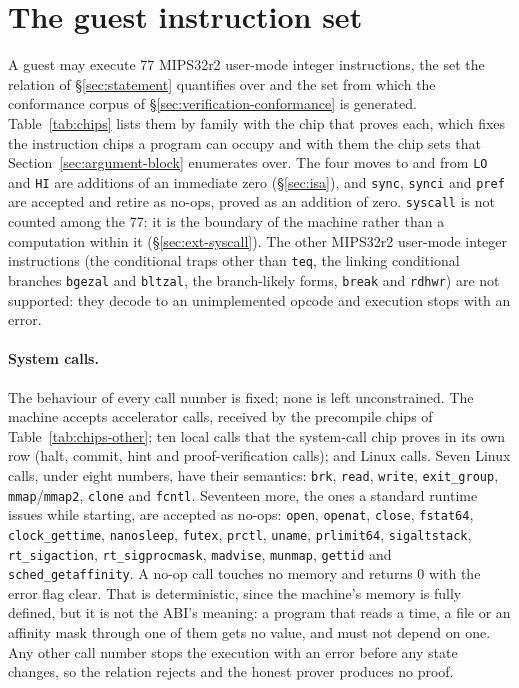 \section{The guest instruction set}
\label{sec:app-isa}

A guest may execute 77 MIPS32r2 user-mode integer instructions, the set the relation of \S\ref{sec:statement} quantifies over and the set from which the conformance corpus of \S\ref{sec:verification-conformance} is generated. Table~\ref{tab:chips} lists them by family with the chip that proves each, which fixes the instruction chips a program can occupy and with them the chip sets that Section~\ref{sec:argument-block} enumerates over. The four moves to and from \texttt{LO} and \texttt{HI} are additions of an immediate zero (\S\ref{sec:isa}), and \texttt{sync}, \texttt{synci} and \texttt{pref} are accepted and retire as no-ops, proved as an addition of zero. \texttt{syscall} is not counted among the 77: it is the boundary of the machine rather than a computation within it (\S\ref{sec:ext-syscall}). The other MIPS32r2 user-mode integer instructions (the conditional traps other than \texttt{teq}, the linking conditional branches \texttt{bgezal} and \texttt{bltzal}, the branch-likely forms, \texttt{break} and \texttt{rdhwr}) are not supported: they decode to an unimplemented opcode and execution stops with an error.

\paragraph{System calls.} The behaviour of every call number is fixed; none is left unconstrained. The machine accepts accelerator calls, received by the precompile chips of Table~\ref{tab:chips-other}; ten local calls that the system-call chip proves in its own row (halt, commit, hint and proof-verification calls); and Linux calls. Seven Linux calls, under eight numbers, have their semantics: \texttt{brk}, \texttt{read}, \texttt{write}, \texttt{exit\_group}, \texttt{mmap}/\texttt{mmap2}, \texttt{clone} and \texttt{fcntl}. Seventeen more, the ones a standard runtime issues while starting, are accepted as no-ops: \texttt{open}, \texttt{openat}, \texttt{close}, \texttt{fstat64}, \texttt{clock\_gettime}, \texttt{nanosleep}, \texttt{futex}, \texttt{prctl}, \texttt{uname}, \texttt{prlimit64}, \texttt{sigaltstack}, \texttt{rt\_sigaction}, \texttt{rt\_sigprocmask}, \texttt{madvise}, \texttt{munmap}, \texttt{gettid} and \texttt{sched\_getaffinity}. A no-op call touches no memory and returns $0$ with the error flag clear. That is deterministic, since the machine's memory is fully defined, but it is not the ABI's meaning: a program that reads a time, a file or an affinity mask through one of them gets no value, and must not depend on one. Any other call number stops the execution with an error before any state changes, so the relation rejects and the honest prover produces no proof.

